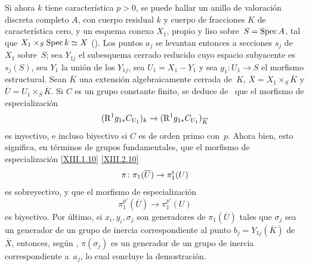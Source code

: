 Si ahora $k$ tiene característica $p>0$, se puede hallar un anillo de
valoración discreta completo $A$, con cuerpo residual $k$ y cuerpo de
fracciones $K$ de característica cero, y un esquema conexo $X_1$, propio
y liso sobre~$S=\operatorname{Spec} A$, tal que
$X_1\times_S\operatorname{Spec} k\simeq X$ (). Los puntos $a_j$ se
levantan entonces a secciones $s_j$ de~$X_1$ sobre~$S$; sea $Y_{1j}$ el
subesquema cerrado reducido cuyo espacio subyacente es $s_j(S)$, sea $Y_1$
la unión de los $Y_{1j}$, sea $U_1=X_1-Y_1$ y sea
$g_1\colon U_1\to S$ el morfismo estructural. Sean $\overline K$ una
extensión algebraicamente cerrada de~$K$,
{}
{$\overline X=X_1\times_S\overline K$ y}
$\overline U=U_1\times_S\overline K$. Si $C$ es un grupo constante finito,
se deduce de~ que el morfismo de especialización
$$
(\mathrm{R}^1g_{1*}C_{U_1})_k\to(\mathrm{R}^1g_{1*}C_{U_1})_{\overline K}
$$
es inyectivo, e incluso biyectivo si $C$ es de orden primo con~$p$.
Ahora bien, esto significa, en términos de grupos fundamentales, que el
morfismo de especialización
{\eqref{XIII.1.10}}
{\eqref{XIII.2.10}}
$$
\pi\colon \pi_1(\overline U)\to\pi^{\mathrm{t}}_1(U)
$$
es sobreyectivo, y que el morfismo de especialización
$$
\pi^{p'}_1(\overline U)\to\pi^{p'}_1(U)
$$
es biyectivo. Por último, si $x_i,y_i,\sigma_j$ son generadores de
$\pi_1(\overline U)$ tales que $\sigma_j$ sea un generador de un grupo de
inercia correspondiente al punto $b_j=Y_{1j}(\overline K)$ de~$\overline X$,
entonces, según
{}
{},
$\pi(\sigma_j)$ es un generador de un grupo de inercia correspondiente
a~$a_j$, lo cual concluye la demostración.

\endgroup
